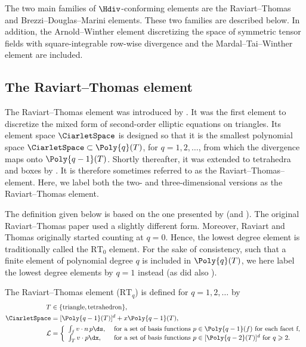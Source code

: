 The two main families of $\Hdiv$-conforming elements are the
Raviart--Thomas and Brezzi--Douglas--Marini elements. These two
families are described below. In addition, the Arnold--Winther element
discretizing the space of symmetric tensor fields with
square-integrable row-wise divergence and the Mardal--Tai--Winther
element are included.

\subsection{The Raviart--Thomas element}
\label{sec:raviartthomas}

The Raviart--Thomas element was introduced
by \citet{RaviartThomas1977}. It was the first element to discretize
the mixed form of second-order elliptic equations on triangles. Its
element space $\CiarletSpace$ is designed so that it is the smallest
polynomial space $\CiarletSpace \subset \Poly{q}(T)$, for $q = 1, 2,
\dots$, from which the divergence maps onto $\Poly{q-1}(T)$. Shortly
thereafter, it was extended to tetrahedra and boxes
by \citet{Nedelec1980}. It is therefore sometimes referred to as the
Raviart--Thomas--\nedelec{} element. Here, we label both the two- and
three-dimensional versions as the Raviart--Thomas element.

The definition given below is based on the one presented
by \citet{Nedelec1980} (and \citet{BrezziFortin1991}). The original
Raviart--Thomas paper used a slightly different form. Moreover,
Raviart and Thomas originally started counting at $q = 0$. Hence, the
lowest degree element is traditionally called the $\mathrm{RT}_0$
element.  For the sake of consistency, such that a finite element of
polynomial degree $q$ is included in $\Poly{q}(T)$, we here label the
lowest degree elements by $q = 1$ instead (as did also \nedelec{}).

\begin{definition}
  The Raviart--Thomas element ($\mathrm{RT}_q$) is
  defined for $q = 1, 2, \dots$ by
  \begin{align}
    T &\in \{ \mathrm{triangle}{}, \mathrm{tetrahedron}{}\}, \\
    \CiarletSpace &= [\Poly{q-1}(T)]^d  + x \Poly{q-1}(T), \\
    \mathcal{L} &=
    \left \{
    \begin{array}{ll}
      \int_{f} v \cdot n \, p \ds,
      & \text{ for a set of basis functions } p \in \Poly{q-1}(f)
      \text{ for each facet } $f$, \\
      \int_{T} v \cdot p \dx,
      & \text{ for a set of basis functions } p \in [\Poly{q-2}(T)]^d
      \text{ for } q \geqslant 2. \\
    \end{array}
    \right .
  \end{align}
\end{definition}

